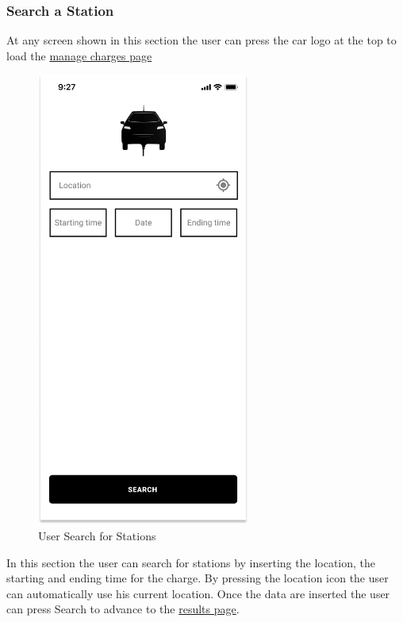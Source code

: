 \subsubsection{Search a Station}
At any screen shown in this section the user can press the car logo at the top to load the \hyperref[fig:myCharges]{manage charges page}
\begin{figure}[H]
    \centering
    \includegraphics[keepaspectratio, height=15cm]{Mockup/UserAppInterface/Station Search.png}
    \caption{User Search for Stations}
    \label{fig:Search}
\end{figure}
In this section the user can search for stations by inserting the location, the starting and ending time for the charge. By pressing the location icon the user can automatically use his current location.
Once the data are inserted the user can press Search to advance to the \hyperref[fig:Results]{results page}.
